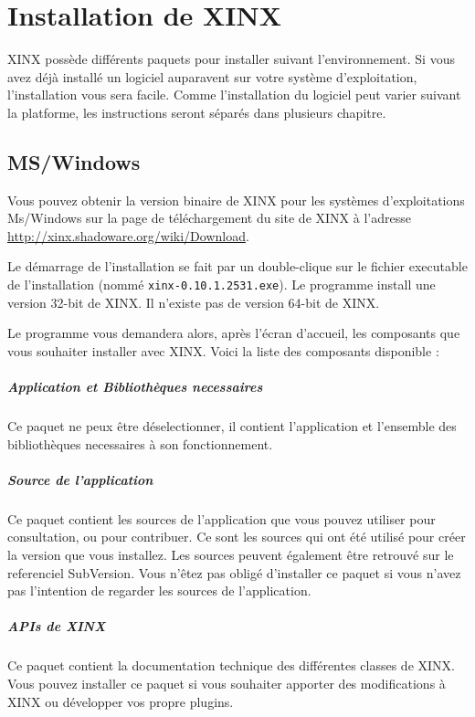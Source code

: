 \documentclass[a4paper,10pt,twoside]{book}
\begin{document}
\chapter{Installation de XINX}

XINX possède différents paquets pour installer suivant l'environnement. Si vous avez déjà installé un logiciel auparavent sur votre système d'exploitation, l'installation vous sera facile. Comme l'installation du logiciel peut varier suivant la platforme, les instructions seront séparés dans plusieurs chapitre.

\section{MS/Windows}

Vous pouvez obtenir la version binaire de XINX pour les systèmes d'exploitations Ms/Windows sur la page de téléchargement du site de XINX à l'adresse \url{http://xinx.shadoware.org/wiki/Download}. 

Le démarrage de l'installation se fait par un double-clique sur le fichier executable de l'installation (nommé \verb+xinx-0.10.1.2531.exe+). Le programme install une version 32-bit de XINX. Il n'existe pas de version 64-bit de XINX.

Le programme vous demandera alors, après l'écran d'accueil, les composants que vous souhaiter installer avec XINX. Voici la liste des composants disponible :

\paragraph{Application et Bibliothèques necessaires} Ce paquet ne peux être déselectionner, il contient l'application et l'ensemble des bibliothèques necessaires à son fonctionnement.
\paragraph{Source de l'application} Ce paquet contient les sources de l'application que vous pouvez utiliser pour consultation, ou pour contribuer. Ce sont les sources qui ont été utilisé pour créer la version que vous installez. Les sources peuvent également être retrouvé sur le referenciel SubVersion. Vous n'êtez pas obligé d'installer ce paquet si vous n'avez pas l'intention de regarder les sources de l'application.
\paragraph{APIs de XINX} Ce paquet contient la documentation technique des différentes classes de XINX. Vous pouvez installer ce paquet si vous souhaiter apporter des modifications à XINX ou développer vos propre plugins.
\end{document}
